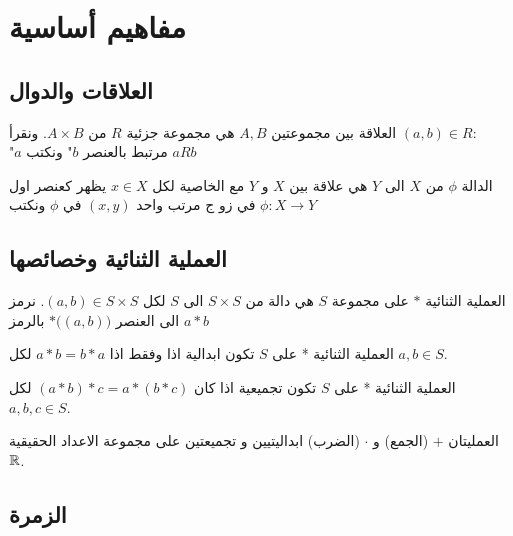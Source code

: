 \chapter{مفاهيم أساسية}

\section{العلاقات والدوال}

\begin{definition}
	العلاقة بين مجموعتين $A, B$ هي مجموعة جزئية $R$ من $A\times B$. ونقرأ $(a, b)\in R$:\\
	"$a$ مرتبط بالعنصر $b$"
	ونكتب $aRb$
\end{definition}

\begin{definition}
	الدالة $\phi$ من $X$ الى $Y$ هي علاقة بين $X$ و $Y$ مع الخاصية لكل $x\in X$ يظهر كعنصر اول في زو ج مرتب واحد $(x, y)$ في $\phi$ ونكتب $\phi:X\to Y$
\end{definition}

\section{العملية الثنائية وخصائصها}

\begin{definition}
	العملية الثنائية $*$ على مجموعة $S$ هي دالة من $S\times S$ الى $S$ لكل $(a,b) \in S\times S$. نرمز الى العنصر $*\big((a, b)\big)$ بالرمز $a*b$
\end{definition}

\begin{definition}
	العملية الثنائية * على $S$ تكون ابدالية اذا وفقط اذا $a*b = b*a$ لكل $a, b\in S$.
\end{definition}

\begin{definition}
	العملية الثنائية * على $S$ تكون تجميعية اذا كان $(a*b)*c = a*(b*c)$ لكل $a, b, c\in S$.
\end{definition}

\begin{example}
	العمليتان $+$ (الجمع) و $\cdot$ (الضرب) ابداليتيين و تجميعتين على مجموعة الاعداد الحقيقية $\mathbb{R}$.
\end{example}

\section{الزمرة}

